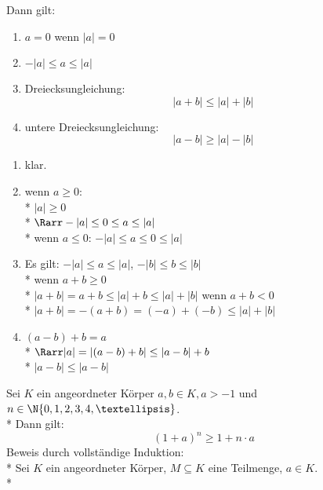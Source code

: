 	Dann gilt:
	\begin{enumerate}
	\item{$a = 0$ wenn $|a| = 0$}
	\item{$-|a| \leq a \leq |a|$}
	\item{Dreiecksungleichung:
	$$|a + b| \leq |a| + |b|$$}
	\item{untere Dreiecksungleichung:
	$$|a - b| \geq |a| - |b|$$}
	\end{enumerate}
\bew
	\begin{enumerate}
	\item{klar.}
	\item{wenn $a \geq 0$:\\*
	$|a| \geq 0$\\*
	$\Rarr -|a| \leq 0 \leq a \leq |a|$\\*
	wenn $a \leq 0$:
	$-|a| \leq a \leq 0 \leq |a|$}
	\item{Es gilt: $-|a| \leq a \leq |a|$, $-|b| \leq b \leq |b|$\\*
	wenn $a + b \geq 0$\\*
	$|a + b| = a + b \leq |a| + b \leq |a| + |b|$
	wenn $a + b < 0$\\*
	$|a + b| = -(a + b) = (-a) + (-b) \leq |a| + |b|$}
	\item{$(a - b) + b = a$\\*
	$\Rarr |a| = |(a - b) + b| \leq |a - b| + b$\\*
	$|a - b| \leq |a - b|$} %
	\end{enumerate}
	Sei $K$ ein angeordneter Körper $a, b \in K, a > -1$ und $n \in \N \{0, 1, 2, 3, 4, …\}$.\\*
	Dann gilt:
	$$(1 + a)^n \geq 1 + n \cdot a$$
	Beweis durch vollständige Induktion:\\*
	Sei $K$ ein angeordneter Körper, $M \subseteq K$ eine Teilmenge, $a \in K$.\\*
